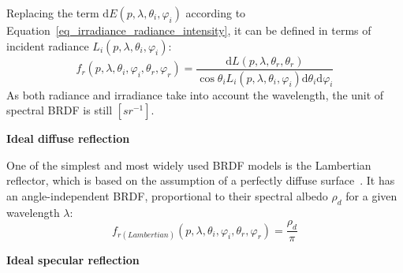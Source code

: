 Replacing the term $\mathrm{d}E(p, \lambda, \theta_i, \varphi_i)$ according to Equation~\eqref{eq_irradiance_radiance_intensity}, it can be defined in terms of incident radiance $L_i(p, \lambda, \theta_i, \varphi_i)$:
\begin{equation}
    f_r(p, \lambda, \theta_i, \varphi_i, \theta_r, \varphi_r) = \frac{\mathrm{d}{L(p, \lambda, \theta_r, \theta_r)}}{\cos\theta_i L_i(p, \lambda, \theta_i, \varphi_i) \mathrm{d} \theta_i \mathrm{d} \varphi_i}
\end{equation}
As both radiance and irradiance take into account the wavelength, the unit of spectral BRDF is still $[sr^{-1}]$.

\textbf{Ideal diffuse reflection}

One of the simplest and most widely used BRDF models is the Lambertian reflector, which is based on the assumption of a perfectly diffuse surface~\cite{2022_Hebert}.
It has an angle-independent BRDF, proportional to their spectral albedo $\rho_d$ for a given wavelength $\lambda$:
\begin{equation}
    \label{eq_Lambertian}
    f_{r(Lambertian)}(p, \lambda, \theta_i, \varphi_i, \theta_r, \varphi_r) = \frac{\rho_d}{\pi}
\end{equation}

\textbf{Ideal specular reflection}

